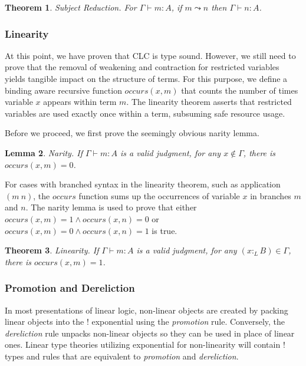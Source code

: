 \documentclass[sigplan,screen,review,authordraft]{acmart}
\newtheorem{theorem}{Theorem}[section]
\newtheorem{lemma}[theorem]{Lemma}
\theoremstyle{definition}
\newcommand{\ltype}{:_{\scriptscriptstyle L}}
\newcommand{\pstep}{\leadsto}
\begin{document}
  \begin{theorem} 
    Subject Reduction. For $\Gamma \vdash m : A$, if $m \pstep n$ then $\Gamma \vdash n : A$.
  \end{theorem}

  \subsubsection{Linearity}
  At this point, we have proven that CLC is type sound. However, we still need to prove that the removal of weakening and contraction for restricted variables yields tangible impact on the structure of terms. For this purpose, we define a binding aware recursive function $occurs(x, m)$ that counts the number of times variable $x$ appears within term $m$. The linearity theorem asserts that restricted variables are used exactly once within a term, subsuming safe resource usage.

  Before we proceed, we first prove the seemingly obvious narity lemma. 

  \begin{lemma} 
    Narity. If $\Gamma \vdash m : A$ is a valid judgment, for any $x \notin \Gamma$, there is $occurs(x, m) = 0$.
  \end{lemma}

  For cases with branched syntax in the linearity theorem, such as application $(m\ n)$, the $occurs$ function sums up the occurrences of variable $x$ in branches $m$ and $n$. The narity lemma is used to prove that either $occurs(x, m) = 1 \wedge occurs(x, n) = 0$ or $occurs(x, m) = 0 \wedge occurs(x, n) = 1$ is true.

  \begin{theorem} 
    Linearity. If $\Gamma \vdash m : A$ is a valid judgment, for any $(x \ltype B) \in \Gamma$, there is $occurs(x, m) = 1$.
  \end{theorem}

  \subsubsection{Promotion and Dereliction}
  In most presentations of linear logic, non-linear objects are created by packing linear objects into the ! exponential using the \textit{promotion} rule. Conversely, the \textit{dereliction} rule unpacks non-linear objects so they can be used in place of linear ones. Linear type theories \cite{abramsky1993,dill,vakar14} utilizing exponential for non-linearity will contain ! types and rules that are equivalent to \textit{promotion} and \textit{dereliction}.
\end{document}
